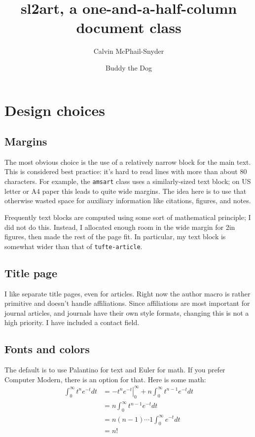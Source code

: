 \documentclass[margincite]{sl2ams}
\title{sl2art, a one-and-a-half-column document class}
\author{Calvin McPhail-Snyder \and Buddy the Dog}{}
\begin{document}


\maketitle
\tableofcontents

\section{Design choices}

\subsection{Margins}
The most obvious choice is the use of a relatively narrow block for the main text.
This is considered best practice: it's hard to read lines with more than about 80 characters.
For example, the \texttt{amsart} class uses a similarly-sized text block; on US letter or A4 paper this leads to quite wide margins.
The idea here is to use that otherwise wasted space for auxiliary information like citations, figures, and notes.

Frequently text blocks are computed using some sort of mathematical principle; I did not do this.
Instead, I allocated enough room in the wide margin for 2in figures, then made the rest of the page fit.
In particular, my text block is somewhat wider than that of \texttt{tufte-article}.

\subsection{Title page}
I like separate title pages, even for articles.
Right now the author macro is rather primitive and doesn't handle affiliations.
Since affiliations are most important for journal articles, and journals have their own style formats, changing this is not a high priority.
I have included a contact field.

\subsection{Fonts and colors}
The default is to use Palantino for text and Euler for math.
If you prefer Computer Modern, there is an option for that.
Here is some math:
\begin{align*}
  \int_{0}^{\infty} t^{n} e^{-t} dt
  &=
  \left.- t^{n} e^{-t} \right|_{0}^{\infty}
  +
  n \int_{0}^{\infty} t^{n-1} e^{-t} dt
  \\
  &=
  n \int_{0}^{\infty} t^{n-1} e^{-t} dt
  \\
  &= n(n-1) \cdots 1 \int_{0}^{\infty} e^{-t} dt
  \\
  &= n!
\end{align*}
\end{document}
